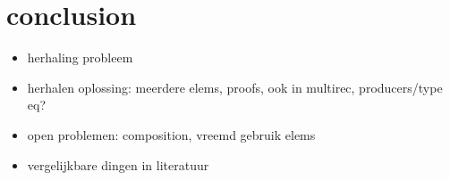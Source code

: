 \chapter{conclusion}
\label{cha:conclusion}

\begin{itemize}
	\item herhaling probleem
	\item herhalen oplossing: meerdere elems, proofs, ook in multirec, producers/type eq?
	\item open problemen: composition, vreemd gebruik elems
	\item vergelijkbare dingen in literatuur
\end{itemize}
